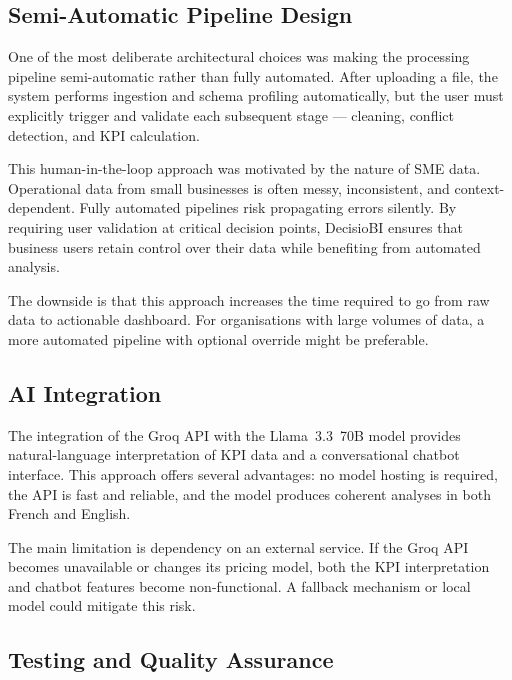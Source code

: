 \subsection{Semi-Automatic Pipeline Design}

\noindent
One of the most deliberate architectural choices
was making the processing pipeline semi-automatic
rather than fully automated.
After uploading a file, the system performs
ingestion and schema profiling automatically,
but the user must explicitly trigger
and validate each subsequent stage —
cleaning, conflict detection, and KPI calculation.

\vspace{0.3cm}
\noindent
This human-in-the-loop approach was motivated
by the nature of SME data.
Operational data from small businesses
is often messy, inconsistent,
and context-dependent.
Fully automated pipelines risk propagating
errors silently.
By requiring user validation at critical decision points,
DecisioBI ensures that business users
retain control over their data
while benefiting from automated analysis.

\vspace{0.3cm}
\noindent
The downside is that this approach
increases the time required to go
from raw data to actionable dashboard.
For organisations with large volumes of data,
a more automated pipeline with optional override
might be preferable.

\subsection{AI Integration}

\noindent
The integration of the Groq API
with the Llama~3.3~70B model
provides natural-language interpretation
of KPI data and a conversational chatbot
interface.
This approach offers several advantages:
no model hosting is required,
the API is fast and reliable,
and the model produces coherent analyses
in both French and English.

\vspace{0.3cm}
\noindent
The main limitation is dependency on an external service.
If the Groq API becomes unavailable
or changes its pricing model,
both the KPI interpretation and chatbot features
become non-functional.
A fallback mechanism or local model
could mitigate this risk.

\subsection{Testing and Quality Assurance}

